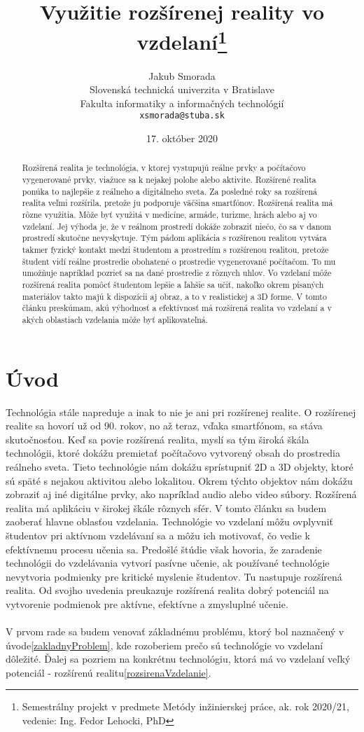 \documentclass[10pt,oneside,slovak,a4paper]{article}
\title{Využitie rozšírenej reality vo vzdelaní\thanks{Semestrálny projekt v predmete Metódy inžinierskej práce, ak. rok 2020/21, vedenie: Ing. Fedor Lehocki, PhD}}
\author{Jakub Smorada\\[2pt]
	{\small Slovenská technická univerzita v Bratislave}\\
	{\small Fakulta informatiky a informačných technológií}\\
	{\small \texttt{xsmorada@stuba.sk}}
	}
\date{\small 17. október 2020}
\begin{document}
\maketitle

\begin{abstract}
Rozšírená realita je technológia, v ktorej vystupujú reálne prvky a počítačovo vygenerované prvky, viažuce sa k nejakej polohe alebo aktivite.
Rozšírené realita ponúka to najlepšie z reálneho a digitálneho sveta. 
Za posledné roky sa rozšírená realita veľmi rozšírila, pretože ju podporuje väčšina smartfónov. 
Rozšírená realita má rôzne využitia. 
Môže byť využitá v medicíne, armáde, turizme, hrách alebo aj vo vzdelaní. 
Jej výhoda je, že v reálnom prostredí dokáže zobraziť niečo, čo sa v danom prostredí skutočne nevyskytuje. 
Tým pádom aplikácia s rozšírenou realitou vytvára takmer fyzický kontakt medzi študentom a prostredím s rozšírenou realitou, pretože študent vidí reálne prostredie obohatené o prostredie vygenerované počítačom. 
To mu umožňuje napríklad pozrieť sa na dané prostredie z rôznych uhlov. 
Vo vzdelaní môže rozšírená realita pomôcť študentom lepšie a ľahšie sa učiť, nakoľko okrem písaných materiálov takto majú k dispozícii aj obraz, a to v realistickej a 3D forme. 
V tomto článku preskúmam, akú výhodnosť a efektívnosť má rozšírená realita vo vzdelaní a v akých oblastiach vzdelania môže byť aplikovateľná.
\end{abstract}

\section{Úvod}
Technológia stále napreduje a inak to nie je ani pri rozšírenej realite.  
O rozšírenej realite sa hovorí už od 90. rokov, no až teraz, vďaka smartfónom, sa stáva skutočnosťou.\cite{Yuen2011} 
Keď sa povie rozšírená realita, myslí sa tým široká škála technológii, ktoré dokážu premietať počítačovo vytvorený obsah do prostredia reálneho sveta.\cite{Yuen2011}
Tieto technológie nám dokážu sprístupniť 2D a 3D objekty, ktoré sú späté s nejakou aktivitou alebo lokalitou. 
Okrem týchto objektov nám dokážu zobraziť aj iné digitálne prvky, ako napríklad audio alebo video súbory.\cite{Yuen2011} 
Rozšírená realita má aplikáciu v širokej škále rôznych sfér. V tomto článku sa budem zaoberať hlavne oblasťou vzdelania. 
Technológie vo vzdelaní môžu ovplyvniť študentov pri aktívnom vzdelávaní sa a môžu ich motivovať, čo vedie k efektívnemu procesu učenia sa.\cite{Saidin2015}
Predošlé štúdie však hovoria, že zaradenie technológii do vzdelávania vytvorí pasívne učenie, ak používané technológie nevytvoria podmienky pre kritické myslenie študentov.\cite{Saidin2015}
Tu nastupuje rozšírená realita.
Od svojho uvedenia preukazuje rozšírená realita dobrý potenciál na vytvorenie podmienok pre aktívne, efektívne a zmysluplné učenie.\cite{Saidin2015}
\\\\V prvom rade sa budem venovať základnému problému, ktorý bol naznačený v úvode\ref{zakladnyProblem}, kde rozoberiem prečo sú technológie vo vzdelaní dôležité.
Ďalej sa pozriem na konkrétnu technológiu, ktorá má vo vzdelaní veľký potenciál - rozšírenú realitu\ref{rozsirenaVzdelanie}.
\end{document}
